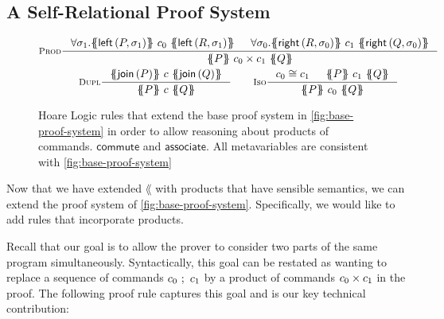 \documentclass[p.tex]{subfiles}
\begin{document}
\subsection{A Self-Relational Proof System}
\begin{figure}
\begin{spreadlines}{5pt}
\begin{gather*}
  \inference[\textsc{Prod}]{%
    \forall \sigma_1.
      \hoare{\aleft\left(P,\sigma_1\right)}
            {c_0}
            {\aleft\left(R,\sigma_1\right)}&
    \forall \sigma_0.
      \hoare{\aright\left(R,\sigma_0\right)}
            {c_1}
            {\aright\left(Q,\sigma_0\right)}
  }{%
    \hoare{P}{c_0 \times c_1}{Q}
  }
  \\
  \inference[\textsc{Dupl}]{%
    \hoare{\ajoin\left(P\right)}{c}{\ajoin\left(Q\right)}
  }{%
    \hoare{P}{c}{Q}
  }
  \qquad
  \inference[\textsc{Iso}]{%
    c_0 \cong c_1&
    \hoare{P}{c_1}{Q}
  }{%
    \hoare{P}{c_0}{Q}
  }
\end{gather*}
\end{spreadlines}
\caption{%
  Hoare Logic rules that extend the base proof system in
  \cref{fig:base-proof-system} in order to allow reasoning about
  products of commands.
  $\textsf{commute}$ and $\textsf{associate}$.
  All metavariables are consistent with \cref{fig:base-proof-system}
}\label{fig:proof-rules}
\end{figure}

Now that we have extended $\lang$ with products that have sensible
semantics, we can extend the proof system of
\cref{fig:base-proof-system}.
Specifically, we would like to add rules that incorporate products.

Recall that our goal is to allow the prover to consider two parts of
the same program simultaneously. Syntactically, this goal can be
restated as wanting to replace a sequence of commands $c_0~;~c_1$
by a product of commands $c_0\times c_1$ in the proof.
The following proof rule captures this goal and is our key technical
contribution:
\end{document}
